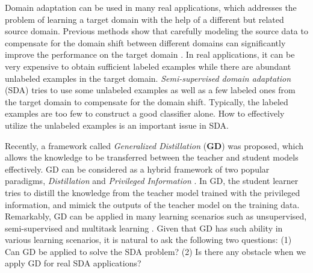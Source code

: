 
Domain adaptation can be used in many real applications, which addresses the problem of learning a target domain with the help of a different but related source domain. Previous methods show that carefully modeling the source data to compensate for the domain shift between different domains can significantly improve the performance on the target domain \cite{Donahue_2013_CVPR}. In real applications, it can be very expensive to obtain sufficient labeled examples while there are abundant unlabeled examples in the target domain. 
\textit{Semi-supervised domain adaptation} (SDA) tries to use some unlabeled examples as well as a few labeled ones from the target domain to compensate for the domain shift\cite{karl2001long}. Typically, the labeled examples are too few to construct a good classifier alone. How to effectively utilize the unlabeled examples is an important issue in SDA. 

Recently, a framework called \textit{Generalized Distillation} (\textbf{GD}) \cite{lopez2015unifying} was proposed, which allows the knowledge to be transferred between the teacher and student models effectively. GD can be considered as a hybrid framework of two popular paradigms, \textit{Distillation} \cite{hinton2015distilling} and \textit{Privileged Information} \cite{vapnik2015learning}. In GD, the student learner tries to distill the knowledge from the teacher model trained with the privileged information, and mimick the outputs of the teacher model on the training data. Remarkably, GD can be applied in many learning scenarios such as unsupervised, semi-supervised and multitask learning \cite{lopez2015unifying}. Given that GD has such ability in various learning scenarios, it is natural to ask the following two questions: (1) Can GD be applied to solve the SDA problem? (2) Is there any obstacle when we apply GD for real SDA applications?

